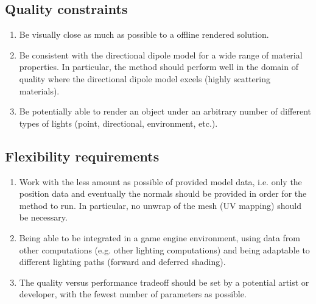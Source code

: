 \subsection{Quality constraints}
 \label{sec:quality}
\begin{enumerate}
\setlength{\itemsep}{-1pt}
	\item Be visually close as much as possible to a offline rendered solution.
	\item Be consistent with the directional dipole model for a wide range of material properties. In particular, the method should perform well in the domain of quality where the directional dipole model excels (highly scattering materials).
	\item Be potentially able to render an object under an arbitrary number of different types of lights (point, directional, environment, etc.).
\end{enumerate}

\subsection{Flexibility requirements}	
\begin{enumerate}
\setlength{\itemsep}{-1pt}
	\item Work with the less amount as possible of provided model data, i.e. only the position data and eventually the normals should be provided in order for the method to run. In particular, no unwrap of the mesh (UV mapping) should be necessary. 
	\item Being able to be integrated in a game engine environment, using data from other computations (e.g. other lighting computations) and being adaptable to different lighting paths (forward and deferred shading).
  \item The quality versus performance tradeoff should be set by a potential artist or developer, with the fewest number of parameters as possible.
\end{enumerate}

